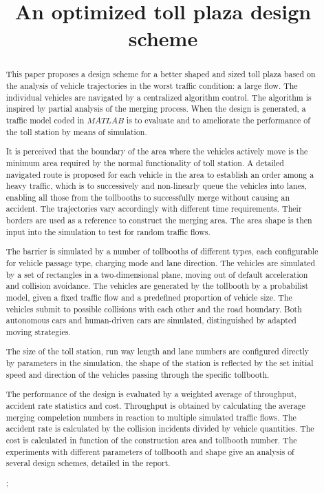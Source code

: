 \documentclass{mcmthesis}
\title{An optimized toll plaza design scheme}
\begin{document}
	
	
\begin{abstract}
	
This paper proposes a design scheme for a better shaped and sized toll plaza based on the analysis of vehicle trajectories in the worst traffic condition: a large flow. The individual vehicles are navigated by a centralized algorithm control. The algorithm is inspired by partial analysis of the merging process. When the design is generated, a traffic model coded in $MATLAB$ is to evaluate and to ameliorate the performance of the toll station by means of simulation.

It is perceived that the boundary of the area where the vehicles actively move is the minimum area required by the normal functionality of toll station. A detailed navigated route is proposed for each vehicle in the area to establish an order among a heavy traffic, which is to successively and non-linearly queue the vehicles into lanes, enabling all those from the tollbooths to successfully merge without causing an accident. The trajectories vary accordingly with different time requirements. Their borders are used as a reference to construct the merging area. The area shape is then input into the simulation to test for random traffic flows. 

The barrier is simulated by a number of tollbooths of different types, each configurable for vehicle passage type, charging mode and lane direction. The vehicles are simulated by a set of rectangles in a two-dimensional plane, moving out of default acceleration and collision avoidance. The vehicles are generated by the tollbooth by a probabilist model, given a fixed traffic flow and a predefined proportion of vehicle size. The vehicles submit to possible collisions with each other  and the road boundary. Both autonomous cars and human-driven cars are simulated, distinguished by adapted moving strategies.

The size of the toll station, run way length and lane numbers are configured directly by parameters in the simulation, the shape of the station is reflected by the set initial speed and direction of the vehicles passing through the specific tollbooth. 

The performance of the design is evaluated by a weighted average of throughput, accident rate statistics and cost. Throughput is obtained by calculating the average merging compeletion numbers in reaction to multiple simulated traffic flows. The accident rate is calculated by the collision incidents divided by vehicle quantities. The cost is calculated in function of the construction area and tollbooth number. The experiments with different parameters of tollbooth and shape give an analysis of several design schemes, detailed in the report.


\begin{keywords}
;
\end{keywords}
\end{abstract}
\end{document}
